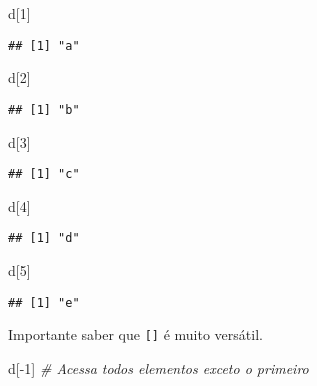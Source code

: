 \documentclass[
]{book}
\newenvironment{Shaded}{\begin{snugshade}}{\end{snugshade}}
\newcommand{\CommentTok}[1]{\textcolor[rgb]{0.56,0.35,0.01}{\textit{#1}}}
\newcommand{\DecValTok}[1]{\textcolor[rgb]{0.00,0.00,0.81}{#1}}
\newcommand{\NormalTok}[1]{#1}
\newcommand{\SpecialCharTok}[1]{\textcolor[rgb]{0.00,0.00,0.00}{#1}}
\begin{document}
\begin{Shaded}
\begin{Highlighting}[]
\NormalTok{d[}\DecValTok{1}\NormalTok{]}
\end{Highlighting}
\end{Shaded}

\begin{verbatim}
## [1] "a"
\end{verbatim}

\begin{Shaded}
\begin{Highlighting}[]
\NormalTok{d[}\DecValTok{2}\NormalTok{]}
\end{Highlighting}
\end{Shaded}

\begin{verbatim}
## [1] "b"
\end{verbatim}

\begin{Shaded}
\begin{Highlighting}[]
\NormalTok{d[}\DecValTok{3}\NormalTok{]}
\end{Highlighting}
\end{Shaded}

\begin{verbatim}
## [1] "c"
\end{verbatim}

\begin{Shaded}
\begin{Highlighting}[]
\NormalTok{d[}\DecValTok{4}\NormalTok{]}
\end{Highlighting}
\end{Shaded}

\begin{verbatim}
## [1] "d"
\end{verbatim}

\begin{Shaded}
\begin{Highlighting}[]
\NormalTok{d[}\DecValTok{5}\NormalTok{]}
\end{Highlighting}
\end{Shaded}

\begin{verbatim}
## [1] "e"
\end{verbatim}

Importante saber que \texttt{{[}{]}} é muito versátil.

\begin{Shaded}
\begin{Highlighting}[]
\NormalTok{d[}\SpecialCharTok{{-}}\DecValTok{1}\NormalTok{] }\CommentTok{\# Acessa todos elementos exceto o primeiro}
\end{Highlighting}
\end{Shaded}
\end{document}
